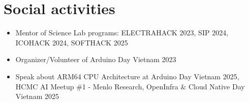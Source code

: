 \documentclass[letterpaper,11pt]{article}
\newcommand{\resumeItemNornal}[1]{
  \item\small{
    {#1 \vspace{-2pt}}
  }
}
\newcommand{\resumeSubItemNormal}[1]{\resumeItemNornal{#1}\vspace{-4pt}}
\newcommand{\resumeSubHeadingListStart}{\begin{itemize}[leftmargin=*]}
\newcommand{\resumeSubHeadingListEnd}{\end{itemize}}
\begin{document}
\section{Social activities}
  \resumeSubHeadingListStart
    \resumeSubItemNormal
      {Mentor of Science Lab programs: ELECTRAHACK 2023, SIP 2024, ICOHACK 2024, SOFTHACK 2025}
    \resumeSubItemNormal
      {Organizer/Volunteer of Arduino Day Vietnam 2023}
    \resumeSubItemNormal
      {Speak about ARM64 CPU Architecture at Arduino Day Vietnam 2025, HCMC AI Meetup \#1 - Menlo Research, OpenInfra \& Cloud Native Day Vietnam 2025}

\resumeSubHeadingListEnd

   
\end{document}
